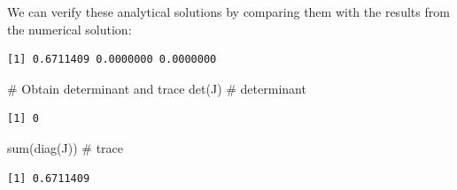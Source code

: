 \documentclass[
  letterpaper,
  DIV=11,
  numbers=noendperiod]{scrreprt}
\newenvironment{Shaded}{\begin{snugshade}}{\end{snugshade}}
\newcommand{\AttributeTok}[1]{\textcolor[rgb]{0.40,0.45,0.13}{#1}}
\newcommand{\CommentTok}[1]{\textcolor[rgb]{0.37,0.37,0.37}{#1}}
\newcommand{\ConstantTok}[1]{\textcolor[rgb]{0.56,0.35,0.01}{#1}}
\newcommand{\DecValTok}[1]{\textcolor[rgb]{0.68,0.00,0.00}{#1}}
\newcommand{\FunctionTok}[1]{\textcolor[rgb]{0.28,0.35,0.67}{#1}}
\newcommand{\NormalTok}[1]{\textcolor[rgb]{0.00,0.23,0.31}{#1}}
\newcommand{\OtherTok}[1]{\textcolor[rgb]{0.00,0.23,0.31}{#1}}
\newcommand{\SpecialCharTok}[1]{\textcolor[rgb]{0.37,0.37,0.37}{#1}}
\begin{document}
We can verify these analytical solutions by comparing them with the
results from the numerical solution:

\begin{Shaded}
\end{Shaded}

\begin{verbatim}
[1] 0.6711409 0.0000000 0.0000000
\end{verbatim}

\begin{Shaded}
\begin{Highlighting}[]
\CommentTok{\# Obtain determinant and trace}
\FunctionTok{det}\NormalTok{(J)       }\CommentTok{\# determinant}
\end{Highlighting}
\end{Shaded}

\begin{verbatim}
[1] 0
\end{verbatim}

\begin{Shaded}
\begin{Highlighting}[]
\FunctionTok{sum}\NormalTok{(}\FunctionTok{diag}\NormalTok{(J)) }\CommentTok{\# trace}
\end{Highlighting}
\end{Shaded}

\begin{verbatim}
[1] 0.6711409
\end{verbatim}
\end{document}
